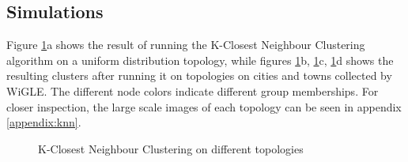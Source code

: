\subsection{Simulations}
Figure \ref{fig:knearest}a shows the result of running the K-Closest Neighbour Clustering algorithm on a uniform distribution topology, while figures \ref{fig:knearest}b, \ref{fig:knearest}c, \ref{fig:knearest}d shows the resulting clusters after running it on topologies on cities and towns collected by WiGLE. The different node colors indicate different group memberships. For closer inspection,
the large scale images of each topology can be seen in appendix \ref{appendix:knn}.
\begin{figure}
		\centering
		\qquad
		\qquad

		\qquad
		\qquad
		\caption{K-Closest Neighbour Clustering on different topologies}%
		\label{fig:knearest}%
\end{figure}

